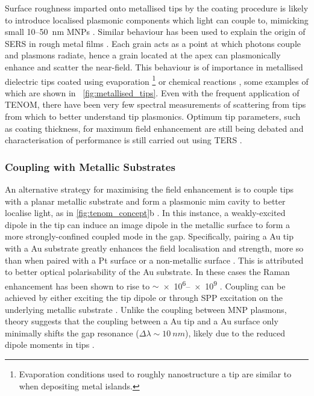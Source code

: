 \documentclass{article}
\begin{document}
Surface roughness imparted onto metallised tips by the coating procedure is likely to introduce localised plasmonic components which light can couple to, mimicking small 10--\SI{50}{nm} MNPs \cite{mino2014}. Similar behaviour has been used to explain the origin of SERS in rough metal films \cite{fleischmann1974, jeanmaire1977}. Each grain acts as a point at which photons couple and plasmons radiate, hence a grain located at the apex can plasmonically enhance and scatter the near-field. This behaviour is of importance in metallised dielectric tips coated using evaporation%
\footnote{Evaporation conditions used to roughly nanostructure a tip are similar to when depositing metal islands.}
\cite{hayazawa2001, hayazawa2012, mino2014} or chemical reactions \cite{bailo2008}, some examples of which are shown in \figurename~\ref{fig:metallised_tips}. Even with the frequent application of TENOM, there have been very few spectral measurements of scattering from tips from which to better understand tip plasmonics. Optimum tip parameters, such as coating thickness, for maximum field enhancement are still being debated and characterisation of performance is still carried out using TERS \cite{meng2015}.

\subsubsection{Coupling with Metallic Substrates}

An alternative strategy for maximising the field enhancement is to couple tips with a planar metallic substrate and form a plasmonic \gls{mim} cavity to better localise light, as in \autoref{fig:tenom_concept}b \cite{ren2004, neacsu2006, hayazawa2007, yano2007, pettinger2009, uetsuki2012, lindquist2013}. In this instance, a weakly-excited dipole in the tip can induce an image dipole in the metallic surface to form a more strongly-confined coupled mode in the gap. Specifically, pairing a Au tip with a Au substrate greatly enhances the field localisation and strength, more so than when paired with a Pt surface \cite{ren2004} or a non-metallic surface \cite{downes2006}. This is attributed to better optical polarisability of the Au substrate. In these cases the Raman enhancement has been shown to rise to $\sim$\num{e6}--\num{e9} \cite{uetsuki2012}. Coupling can be achieved by either exciting the tip dipole or through SPP excitation on the underlying metallic substrate \cite{hayazawa2007, uetsuki2012}. Unlike the coupling between MNP plasmons, theory suggests that the coupling between a Au tip and a Au surface only minimally shifts the gap resonance ($\Delta\lambda\sim\SI{10}{nm}$), likely due to the reduced dipole moments in tips \cite{downes2006}. %
\end{document}
